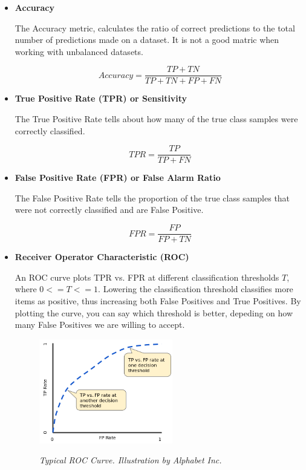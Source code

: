 \begin{itemize}

  \item {\bf Accuracy}

    The Accuracy metric, calculates the ratio of correct predictions to the total number of
    predictions made on a dataset. It is not a good matric when working with
    unbalanced datasets.

    \[Accuracy = \frac{TP + TN}{TP + TN + FP + FN}\]

  \item {\bf True Positive Rate (TPR) or Sensitivity}

    The True Positive Rate tells about how many of the true class samples were
    correctly classified.

    \[TPR = \frac{TP}{TP + FN}\]


  \item {\bf False Positive Rate (FPR) or False Alarm Ratio}

    The False Positive Rate tells the proportion of the true class samples that
    were not correctly classified and are False Positive.

    \[FPR = \frac{FP}{FP + TN}\]


  \item {\bf Receiver Operator Characteristic (ROC)}

  An ROC curve plots TPR vs. FPR at different classification thresholds \(T\),
  where $0 <= T <= 1$. Lowering the classification threshold
  classifies more items as positive, thus increasing both False Positives and
  True Positives. By plotting the curve, you can say which threshold is better,
  depeding on how many False Positives we are willing to accept.

    \begin{figure}[H]
      \centering
      \begin{adjustbox}{trim={0pt 0cm 0pt 0cm}, clip}
        \centering
        \includegraphics[width=0.55\textwidth]{imatges/validation-strategy/ROCCurve.png}
      \end{adjustbox}
        \caption{\textit{Typical ROC Curve. Illustration by Alphabet Inc.}}
      {\label{fig:ROCCurve}}
    \end{figure}



\end{itemize}
